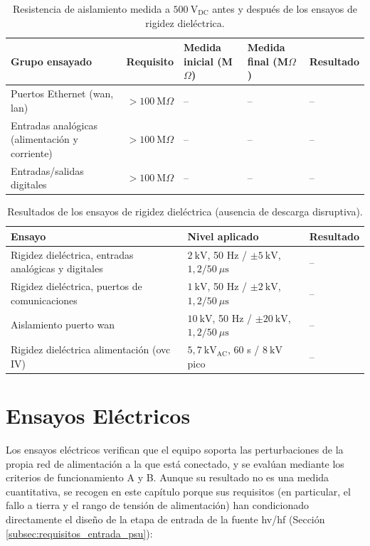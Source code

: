 \begin{table}[!h]
\centering
\small
\begin{tabular}{|p{4.0cm}|p{2.4cm}|p{2.4cm}|p{2.4cm}|p{2.0cm}|}
\hline
\textbf{Grupo ensayado} & \textbf{Requisito} & \textbf{Medida inicial (M$\Omega$)} & \textbf{Medida final (M$\Omega$)} & \textbf{Resultado} \\ \hline
Puertos Ethernet (\gls{wan}, \gls{lan}) & $> 100\ \text{M}\Omega$ & -- & -- & -- \\ \hline
Entradas analógicas (alimentación y corriente) & $> 100\ \text{M}\Omega$ & -- & -- & -- \\ \hline
Entradas/salidas digitales & $> 100\ \text{M}\Omega$ & -- & -- & -- \\ \hline
\end{tabular}
\caption{Resistencia de aislamiento medida a $500\ \text{V}_{\text{DC}}$ antes y después de los ensayos de rigidez dieléctrica.}
\label{tab:resultados_resistencia_aislamiento}
\end{table}

\begin{table}[!h]
\centering
\small
\begin{tabular}{|p{4.6cm}|p{5.6cm}|p{3.6cm}|}
\hline
\textbf{Ensayo} & \textbf{Nivel aplicado} & \textbf{Resultado} \\ \hline
Rigidez dieléctrica, entradas analógicas y digitales & $2\ \text{kV}$, 50 Hz / $\pm 5\ \text{kV}$, $1,2/50\ \mu\text{s}$ & -- \\ \hline
Rigidez dieléctrica, puertos de comunicaciones & $1\ \text{kV}$, 50 Hz / $\pm 2\ \text{kV}$, $1,2/50\ \mu\text{s}$ & -- \\ \hline
Aislamiento puerto \gls{wan} & $10\ \text{kV}$, 50 Hz / $\pm 20\ \text{kV}$, $1,2/50\ \mu\text{s}$ & -- \\ \hline
Rigidez dieléctrica alimentación (\gls{ovc} IV) & $5,7\ \text{kV}_{\text{AC}}$, 60 s / $8\ \text{kV}$ pico & -- \\ \hline
\end{tabular}
\caption{Resultados de los ensayos de rigidez dieléctrica (ausencia de descarga disruptiva).}
\label{tab:resultados_rigidez_dielectrica}
\end{table}

\section{Ensayos Eléctricos}
\label{sec:ensayos_electricos}

Los ensayos eléctricos verifican que el equipo soporta las perturbaciones de la propia red de alimentación a la que está conectado, y se evalúan mediante los criterios de funcionamiento A y B. Aunque su resultado no es una medida cuantitativa, se recogen en este capítulo porque sus requisitos (en particular, el fallo a tierra y el rango de tensión de alimentación) han condicionado directamente el diseño de la etapa de entrada de la fuente \gls{hv}/\gls{hf} (Sección \ref{subsec:requisitos_entrada_psu}):

